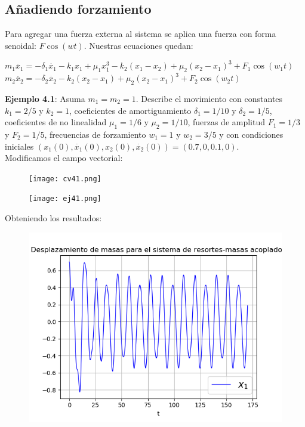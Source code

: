 \documentclass{article}
\begin{document}
\subsection{Añadiendo forzamiento}
Para agregar una fuerza externa al sistema se aplica una fuerza con forma senoidal: $F\cos(wt)$. Nuestras ecuaciones quedan:\\
\begin{center}
$m_{1}\ddot{x_{1}}=-\delta_{1}\dot{x_{1}}-k_{1}x_{1}+\mu_{1}x_{1}^{3}-k_{2}(x_{1}-x_{2})+\mu_{2}(x_{2}-x_{1})^{3}+F_{1}\cos(w_{1}t)$\\
$m_{2}\ddot{x_{2}}=-\delta_{2}\dot{x_{2}}-k_{2}(x_{2}-x_{1})+\mu_{2}(x_{2}-x_{1})^{3}+F_{2}\cos(w_{2}t)$\\
\end{center}
\textbf{Ejemplo 4.1}: Asuma $m_{1}=m_{2}=1$. Describe el movimiento con constantes $k_{1}=2/5$ y $k_{2}=1$, coeficientes de amortiguamiento $\delta_{1}=1/10$ y $\delta_{2}=1/5$, coeficientes de no linealidad $\mu_{1}=1/6$ y $\mu_{2}=1/10$, fuerzas de amplitud $F_{1}=1/3$ y $F_{2}=1/5$, frecuencias de forzamiento $w_{1}=1$ y $w_{2}=3/5$ y con condiciones iniciales $(x_{1}(0),\dot{x_{1}}(0),x_{2}(0),\dot{x_{2}}(0))=(0.7,0,0.1,0)$.\\
Modificamos el campo vectorial:\\
\begin{figure}[H]
	\centering
    \texttt{[image: cv41.png]}
\end{figure}
\begin{figure}[H]
	\centering
    \texttt{[image: ej41.png]}
\end{figure}
Obteniendo los resultados:\\
\begin{figure}[H]
	\centering
    \includegraphics[width=\linewidth]{41_d1.png}
\end{figure}
\end{document}
